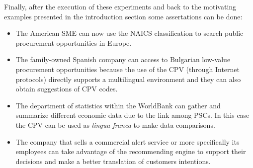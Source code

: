 Finally, after the execution of these experiments and back to the motivating examples 
presented in the introduction section some assertations can be done:
\begin{itemize}
 \item The American SME can now use the NAICS classification to search public procurement 
 opportunities in Europe.
 
 \item The family-owned Spanish company can access to Bulgarian low-value procurement opportunities because the 
 use of the CPV (through Internet protocols) directly supports a multilingual environment and they can also obtain suggestions of CPV codes.
 
 \item The department of statistics within the WorldBank can gather and summarize different economic data due to 
 the link among PSCs. In this case the CPV can be used as \textit{lingua franca} to make data comparisons.
 
 \item The company that sells a commercial alert service or more specifically its employees can take advantage of 
 the recommending engine to support their decisions and make a better translation of customers intentions.
\end{itemize}


